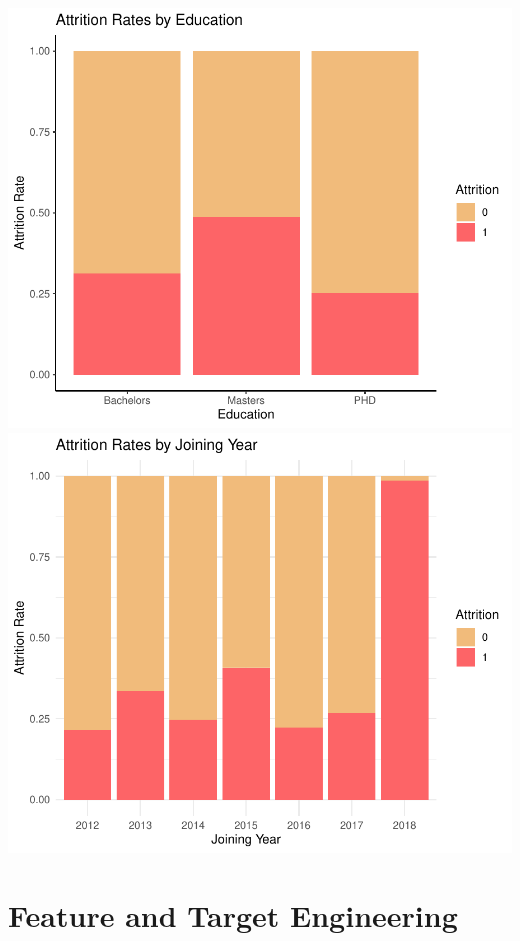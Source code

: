 \documentclass[11pt,preprint, authoryear]{elsarticle}
\numberwithin{equation}{section}
\numberwithin{figure}{section}
\numberwithin{table}{section}
\begin{document}
\includegraphics{Final_project_files/figure-latex/unnamed-chunk-4-1.pdf}
\includegraphics{Final_project_files/figure-latex/unnamed-chunk-4-2.pdf}

\hypertarget{feature-and-target-engineering}{%
\section*{Feature and Target
Engineering}\label{feature-and-target-engineering}}
\end{document}

